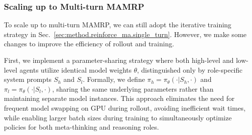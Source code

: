 \subsubsection{Scaling up to Multi-turn MAMRP}
\label{sec:method.reinforce_ma.multi_turn}


To scale up to multi-turn MAMRP, we can still adopt the iterative training strategy in Sec.~\ref{sec:method.reinforce_ma.single_turn}. However, we make some changes to improve the efficiency of rollout and training.

First, we implement a parameter-sharing strategy where both high-level and low-level agents utilize identical model weights $\theta$, distinguished only by role-specific system prompts $S_h$ and $S_l$. Formally, we define $\pi_h = \pi_\theta(\cdot|S_h, \cdot)$ and $\pi_l = \pi_\theta(\cdot|S_l, \cdot)$, sharing the same underlying parameters rather than maintaining separate model instances. 
This approach eliminates the need for frequent model swapping on GPU during rollout, avoiding inefficient wait times, while enabling larger batch sizes during training to simultaneously optimize policies for both meta-thinking and reasoning roles. 


